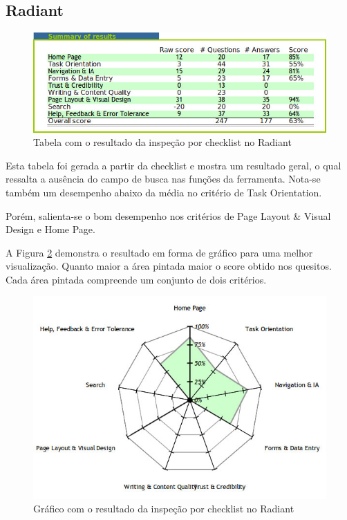 \subsection{Radiant}

\begin{figure}[here]
\includegraphics[width=130mm]{images/radiant_result_checklist_table.jpg}
\caption{Tabela com o resultado da inspeção por checklist no Radiant}
\label{fig:resultado_checklist_radiant_tabela}
\end{figure}

Esta tabela foi gerada a partir da checklist e mostra um resultado geral, o qual ressalta a ausência do campo de busca nas funções da ferramenta. Nota-se também um desempenho abaixo da média no critério de Task Orientation.

Porém, salienta-se o bom desempenho nos critérios de Page Layout \& Visual Design e Home Page.

A Figura \ref{fig:resultado_checklist_radiant_grafico} demonstra o resultado em forma de gráfico para uma melhor visualização. Quanto maior a área pintada maior o score obtido nos quesitos. Cada área pintada compreende um conjunto de dois critérios. 

\begin{figure}[here]
\includegraphics[scale=0.5]{images/radiant_result_checklist_graph.jpg}
\caption{Gráfico com o resultado da inspeção por checklist no Radiant}
\label{fig:resultado_checklist_radiant_grafico}
\end{figure}

